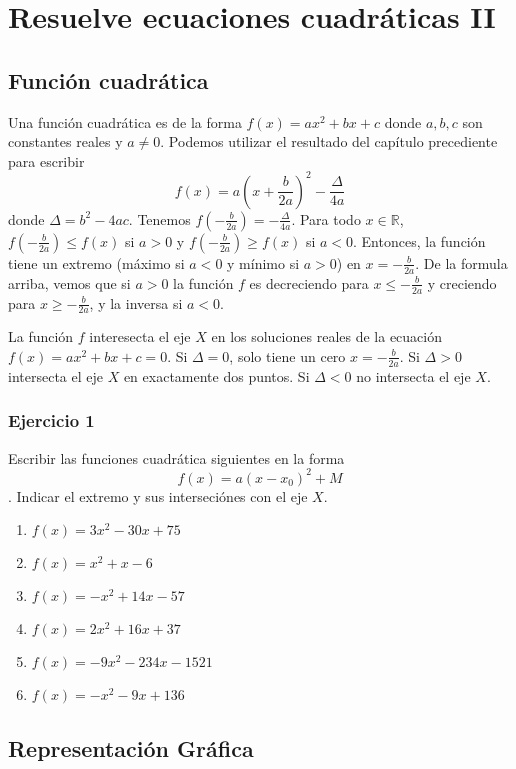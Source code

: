\chapter{Resuelve ecuaciones cuadráticas II}

\section{Función cuadrática}

Una función cuadrática es de la forma $f(x) = ax^2 + bx + c$ donde $a, b, c$
son constantes reales y $a \neq 0$. Podemos utilizar el resultado del
capítulo precediente para escribir
$$f(x) = a \left( x + \frac{b}{2a}\right)^2 - \frac{\Delta}{4a}$$
donde $\Delta = b^2 - 4 a c$. Tenemos
${f\left(-\frac{b}{2a}\right)} = -\frac{\Delta}{4a}$.
Para todo $x \in \mathbb R$, ${f\left(-\frac{b}{2a}\right)}
\leq f(x)$ si $a > 0$ y
${f\left(-\frac{b}{2a}\right)} \geq f(x)$ si $a < 0$. Entonces, la función
tiene un extremo (máximo si $a <0$ y mínimo si $a > 0$) en $x = -\frac{b}{2a}$.
De la formula arriba, vemos que si $a > 0$ la función $f$ es decreciendo para
$x \leq -\frac{b}{2a}$ y creciendo para $x \geq -\frac{b}{2a}$, y la inversa
si $a < 0$.

La función $f$ interesecta el eje $X$ en los soluciones reales de la ecuación
$f(x) = ax^2 + bx + c = 0$. Si $\Delta = 0$, solo tiene un cero
$x = -\frac{b}{2a}$. Si $\Delta > 0$ intersecta el eje $X$ en exactamente dos
puntos. Si $\Delta < 0$ no intersecta el eje $X$.

\subsection*{Ejercicio 1}

Escribir las funciones cuadrática siguientes en la forma
$$f(x) = a \left( x - x_0 \right)^2 + M$$. Indicar el extremo y sus
interseciónes con el eje $X$.

\begin{enumerate}
\item $f(x) = 3x^2 - 30x+75$
\item $f(x) = x^2 + x - 6$
\item $f(x) = -x^2 + 14x - 57$
\item $f(x) = 2x^2 + 16x + 37$
\item $f(x) = -9x^2-234x-1521$
\item $f(x) = -x^2-9x+136$
\end{enumerate}

\section{Representación Gráfica}

